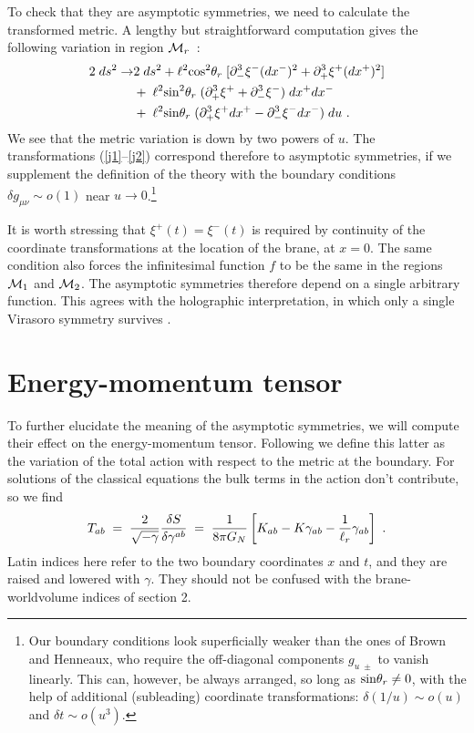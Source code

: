 \documentclass[a4paper,12pt,oneside]{article}
\begin{document}
  To check  that they are  asymptotic symmetries, we need
to calculate the transformed metric. A lengthy but straightforward
computation gives the following variation in region ${\cal M}_r$~:
\begin{eqnarray}
2\; ds^2 \rightarrow & 2\; ds^2 + \ell^2 {\rm cos}^2\theta_r \; [
\partial_-^3\xi^- (dx^-)^2 + \partial_+^3\xi^+ (dx^+)^2] \nonumber \\
\label{metrictr}
&+ \; \ell^2 {\rm sin}^2\theta_r \; (\partial_+^3\xi^+ +
\partial_-^3\xi^-)\; dx^+ dx^-   \\
 &+\; \ell^2  {\rm sin}\theta_r\;
(\partial_+^3\xi^+ dx^+ - \partial_-^3\xi^- dx^-)\; du\
\nonumber .
\end{eqnarray}
\vskip 0.15cm \noindent 
We see that the metric variation is down by two powers of $u$. 
The transformations (\ref{j1}--\ref{j2}) correspond therefore
to asymptotic symmetries, if we supplement the definition
of the theory with  the boundary conditions  $\delta g_{\mu\nu}
\sim o(1)$ near  $u\to 0$.\footnote{Our boundary conditions look
superficially  weaker than the ones 
of Brown and Henneaux, who
require  the off-diagonal components $g_{u\;\pm }$  to vanish linearly.
This can,   however, be always  arranged,  
so long as ${\rm sin}\theta_r \not= 0$, 
with the help of additional (subleading) coordinate transformations: 
$\delta (1/u) \sim o(u)$ and $\delta t \sim o(u^3)$.}

 It is worth stressing that 
$\xi^+(t) =  \xi^-(t)$ is required by continuity of  the
coordinate transformations 
at the location of the brane,  at $x=0$. The same condition also forces
 the  infinitesimal function $f$ 
to be the same  in the regions ${\cal M}_1$ and ${\cal M}_2$.
The asymptotic symmetries therefore  depend on a single
 arbitrary function. 
This agrees with  the holographic interpretation,  
in which only a single   Virasoro symmetry survives \cite{BDDO}. 



\setcounter{equation}{0}
\section{Energy-momentum tensor}

To further elucidate the meaning of the asymptotic  symmetries,
we will compute their effect  on  the 
energy-momentum tensor. Following \cite{BY, BK} we define this latter
 as the variation of the total action with respect to
the  metric at the boundary. For solutions of the classical equations
the bulk terms  in the action don't  contribute,
so we  find  
\begin{equation}
T_{ab}\;  =\;  {2\over \sqrt{-\gamma}}
 {\delta S\over \delta\gamma^{ab}}\;  =\;   {1\over 8\pi G_N}
\left[ K_{ab} - K \gamma_{ab} - {1\over \ell_{r}}\gamma_{ab}\right]  \ .
\label{emtensor}
\end{equation}
Latin indices here refer to the two boundary coordinates $x$ and $t$, and
they are  raised and lowered with $\gamma$. They should not be confused with
the  brane-worldvolume indices of section 2.
\end{document}
